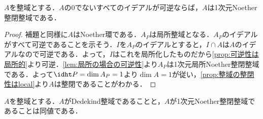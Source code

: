 \begin{prop}\label{prop:すべてのイデアルが可逆ならば1-dimNoether整閉整域}
	$A$を整域とする．$A$の0でないすべてのイデアルが可逆ならば，$A$は1次元Noether整閉整域である．
\end{prop}

\begin{proof}
	補題と同様に$A$はNoether環である．$A_P$は局所整域となる．$A_P$のイデアルがすべて可逆であることを示そう．$I$を$A_P$のイデアルとすると，$I\cap A$は$A$のイデアルなので可逆である．よって，$I$はこれを局所化したものだから\ref{prop:可逆性は局所的}より可逆．\ref{lem:局所の場合の可逆性}より$A_P$は1次元局所Noether整閉整域である．よって$\idht P=\dim A_P=1$より$\dim A=1$が従い，\ref{prop:整域の整閉性はlocal}より$A$は整閉であることがわかる．
\end{proof}

\begin{thm}\label{thm:Dedekind同値条件}
	$A$を整域とする．$A$がDedekind整域であることと，$A$が1次元Noether整閉整域であることは同値である．
\end{thm}

